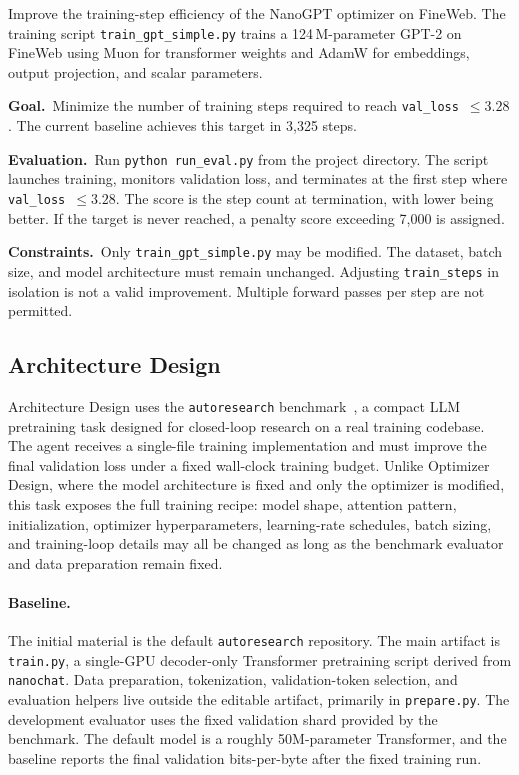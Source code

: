 \documentclass{llmxive}
\begin{document}
\begin{promptbox}[title=\textbf{Optimizer Design Task Instruction}]
Improve the training-step efficiency of the NanoGPT optimizer on FineWeb.
The training script \texttt{train\_gpt\_simple.py} trains a 124\,M-parameter
GPT-2 on FineWeb using Muon for transformer weights and AdamW for embeddings,
output projection, and scalar parameters.

\smallskip
\noindent\textbf{Goal.}~Minimize the number of training steps required to
reach \texttt{val\_loss}~$\leq 3.28$.
The current baseline achieves this target in 3{,}325 steps.

\smallskip
\noindent\textbf{Evaluation.}~Run \texttt{python run\_eval.py} from the
project directory.
The script launches training, monitors validation loss, and terminates at the
first step where \texttt{val\_loss}~$\leq 3.28$.
The score is the step count at termination, with lower being better.
If the target is never reached, a penalty score exceeding 7{,}000 is assigned.

\smallskip
\noindent\textbf{Constraints.}~Only \texttt{train\_gpt\_simple.py} may be
modified.
The dataset, batch size, and model architecture must remain unchanged.
Adjusting \texttt{train\_steps} in isolation is not a valid improvement.
Multiple forward passes per step are not permitted.
\end{promptbox}

\subsection{Architecture Design}
\label{app:benchmark-architecture-design}

Architecture Design uses the \texttt{autoresearch} benchmark~\citep{autoresearch},
a compact LLM pretraining task designed for closed-loop research on a real
training codebase.
The agent receives a single-file training implementation and must improve the
final validation loss under a fixed wall-clock training budget.
Unlike Optimizer Design, where the model architecture is fixed and only the
optimizer is modified, this task exposes the full training recipe: model shape,
attention pattern, initialization, optimizer hyperparameters, learning-rate
schedules, batch sizing, and training-loop details may all be changed as long
as the benchmark evaluator and data preparation remain fixed.

\paragraph{Baseline.}
The initial material is the default \texttt{autoresearch} repository.
The main artifact is \texttt{train.py}, a single-GPU decoder-only Transformer
pretraining script derived from \texttt{nanochat}.
Data preparation, tokenization, validation-token selection, and evaluation
helpers live outside the editable artifact, primarily in \texttt{prepare.py}.
The development evaluator uses the fixed validation shard provided by the benchmark.
The default model is a roughly 50M-parameter Transformer, and the baseline
reports the final validation bits-per-byte after the fixed training run.
\end{document}
